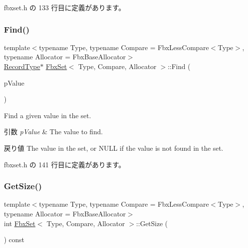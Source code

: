  fbxset.\+h の 133 行目に定義があります。

\mbox{\label{class_fbx_set_ac5bd4cb3958389b323d8375b5b17958f}} 
\subsubsection{\texorpdfstring{Find()}{Find()}\hspace{0.1cm}{\footnotesize\ttfamily [2/2]}}
{\footnotesize\ttfamily template$<$typename Type, typename Compare = Fbx\+Less\+Compare$<$\+Type$>$, typename Allocator = Fbx\+Base\+Allocator$>$ \\
\hyperlink{class_fbx_set_aa3934cd434a09288204f5e6c99b9cd01}{Record\+Type}$\ast$ \hyperlink{class_fbx_set}{Fbx\+Set}$<$ Type, Compare, Allocator $>$\+::Find (\begin{DoxyParamCaption}\item[{const \hyperlink{class_fbx_set_abb0f1b628634e07825532526e2e92baf}{Value\+Type} \&}]{p\+Value }\end{DoxyParamCaption})\hspace{0.3cm}{\ttfamily [inline]}}

Find a given value in the set. 
\begin{DoxyParams}{引数}
{\em p\+Value} & The value to find. \\
\hline
\end{DoxyParams}
\begin{DoxyReturn}{戻り値}
The value in the set, or N\+U\+LL if the value is not found in the set. 
\end{DoxyReturn}


 fbxset.\+h の 141 行目に定義があります。

\mbox{\label{class_fbx_set_a461c8f7332c997970eeb89cf7920b509}} 
\subsubsection{\texorpdfstring{Get\+Size()}{GetSize()}}
{\footnotesize\ttfamily template$<$typename Type, typename Compare = Fbx\+Less\+Compare$<$\+Type$>$, typename Allocator = Fbx\+Base\+Allocator$>$ \\
int \hyperlink{class_fbx_set}{Fbx\+Set}$<$ Type, Compare, Allocator $>$\+::Get\+Size (\begin{DoxyParamCaption}{ }\end{DoxyParamCaption}) const\hspace{0.3cm}{\ttfamily [inline]}}



